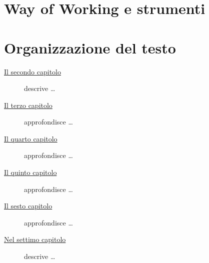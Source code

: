 \section{Way of Working e strumenti}

\section{Organizzazione del testo}

\begin{description}
    \item[{\hyperref[cap:processi-metodologie]{Il secondo capitolo}}] descrive \ldots
    
    \item[{\hyperref[cap:descrizione-stage]{Il terzo capitolo}}] approfondisce \ldots
    
    \item[{\hyperref[cap:analisi-requisiti]{Il quarto capitolo}}] approfondisce \ldots
    
    \item[{\hyperref[cap:progettazione-codifica]{Il quinto capitolo}}] approfondisce \ldots
    
    \item[{\hyperref[cap:verifica-validazione]{Il sesto capitolo}}] approfondisce \ldots
    
    \item[{\hyperref[cap:conclusioni]{Nel settimo capitolo}}] descrive \ldots
\end{description}

